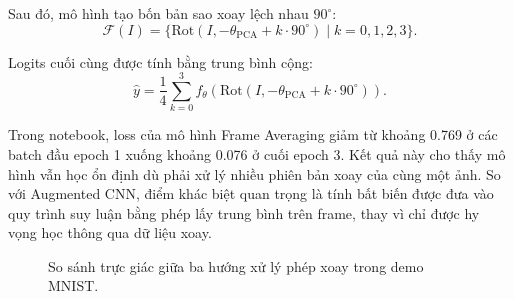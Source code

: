 Sau đó, mô hình tạo bốn bản sao xoay lệch nhau $90^\circ$:
\begin{equation}
    \mathcal{F}(I) = \{\mathrm{Rot}(I,-\theta_{\mathrm{PCA}} + k\cdot90^\circ) \mid k=0,1,2,3\}.
    \label{eq:mnist-frame-set}
\end{equation}

Logits cuối cùng được tính bằng trung bình cộng:
\begin{equation}
    \hat{y} = \frac{1}{4}\sum_{k=0}^{3} f_{\theta}\!\left(\mathrm{Rot}(I,-\theta_{\mathrm{PCA}} + k\cdot90^\circ)\right).
    \label{eq:mnist-frame-average-logits}
\end{equation}

Trong notebook, loss của mô hình Frame Averaging giảm từ khoảng 0.769 ở các batch đầu epoch 1 xuống khoảng 0.076 ở cuối epoch 3. Kết quả này cho thấy mô hình vẫn học ổn định dù phải xử lý nhiều phiên bản xoay của cùng một ảnh. So với Augmented CNN, điểm khác biệt quan trọng là tính bất biến được đưa vào quy trình suy luận bằng phép lấy trung bình trên frame, thay vì chỉ được hy vọng học thông qua dữ liệu xoay.
\begin{figure}[H]
\centering
{}
\caption{So sánh trực giác giữa ba hướng xử lý phép xoay trong demo MNIST.}
\label{fig:demo-part1-compare}
\end{figure}

